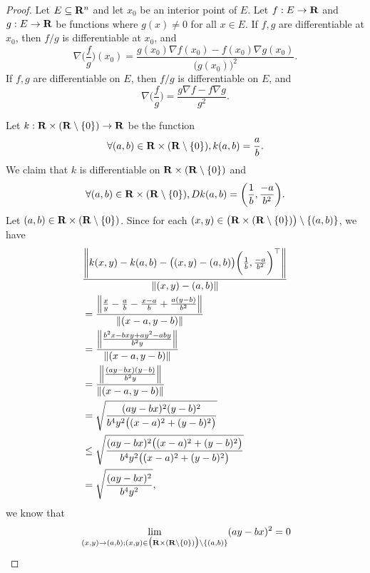\begin{proof}
    Let \(E \subseteq \R^n\) and let \(x_0\) be an interior point of \(E\).
    Let \(f : E \to \R\) and \(g : E \to \R\) be functions where \(g(x) \neq 0\) for all \(x \in E\).
    If \(f, g\) are differentiable at \(x_0\), then \(f / g\) is differentiable at \(x_0\), and
    \[
        \nabla \bigg(\frac{f}{g}\bigg)(x_0) = \frac{g(x_0) \nabla f(x_0) - f(x_0) \nabla g(x_0)}{\big(g(x_0)\big)^2}.
    \]
    If \(f, g\) are differentiable on \(E\), then \(f / g\) is differentiable on \(E\), and
    \[
        \nabla \bigg(\frac{f}{g}\bigg) = \frac{g \nabla f - f \nabla g}{g^2}.
    \]

    Let \(k : \R \times (\R \setminus \{0\}) \to \R\) be the function
    \[
        \forall (a, b) \in \R \times (\R \setminus \{0\}), k(a, b) = \frac{a}{b}.
    \]
    We claim that \(k\) is differentiable on \(\R \times (\R \setminus \{0\})\) and
    \[
        \forall (a, b) \in \R \times (\R \setminus \{0\}), D k(a, b) = \bigg(\frac{1}{b}, \frac{-a}{b^2}\bigg).
    \]
    Let \((a, b) \in \R \times (\R \setminus \{0\})\).
    Since for each \((x, y) \in \big(\R \times (\R \setminus \{0\})\big) \setminus \{(a, b)\}\), we have
    \begin{align*}
         & \frac{\norm*{k(x, y) - k(a, b) - \big((x, y) - (a, b)\big) \bigg(\frac{1}{b}, \frac{-a}{b^2}\bigg)^\top}}{\norm*{(x, y) - (a, b)}} \\
         & = \frac{\norm*{\frac{x}{y} - \frac{a}{b} - \frac{x - a}{b} + \frac{a(y - b)}{b^2}}}{\norm*{(x - a, y - b)}}                        \\
         & = \frac{\norm*{\frac{b^2 x - bxy + ay^2 - aby}{b^2y}}}{\norm*{(x - a, y - b)}}                                                     \\
         & = \frac{\norm*{\frac{(ay - bx)(y - b)}{b^2y}}}{\norm*{(x - a, y - b)}}                                                             \\
         & = \sqrt{\frac{(ay - bx)^2 (y - b)^2}{b^4 y^2 \big((x - a)^2 + (y - b)^2\big)}}                                                     \\
         & \leq \sqrt{\frac{(ay - bx)^2 \big((x - a)^2 + (y - b)^2\big)}{b^4 y^2 \big((x - a)^2 + (y - b)^2\big)}}                            \\
         & = \sqrt{\frac{(ay - bx)^2}{b^4 y^2}},
    \end{align*}
    we know that
    \begin{align*}
                 & \lim_{(x, y) \to (a, b) ; (x, y) \in \big(\R \times (\R \setminus \{0\})\big) \setminus \{(a, b)\}} (ay - bx)^2 = 0                                                                                                                  \\

\end{align*}
\end{proof}
